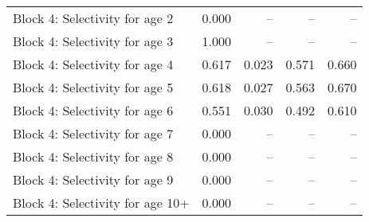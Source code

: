 \documentclass[
]{article}
\begin{document}
\begin{landscape}
\begin{longtable}[t]{lrrrr}
Block 4: Selectivity for age 2 & 0.000 & -- & -- & --\\
Block 4: Selectivity for age 3 & 1.000 & -- & -- & --\\
Block 4: Selectivity for age 4 & 0.617 & 0.023 & 0.571 & 0.660\\
Block 4: Selectivity for age 5 & 0.618 & 0.027 & 0.563 & 0.670\\
\addlinespace
Block 4: Selectivity for age 6 & 0.551 & 0.030 & 0.492 & 0.610\\
Block 4: Selectivity for age 7 & 0.000 & -- & -- & --\\
Block 4: Selectivity for age 8 & 0.000 & -- & -- & --\\
Block 4: Selectivity for age 9 & 0.000 & -- & -- & --\\
Block 4: Selectivity for age 10+ & 0.000 & -- & -- & --\\*
\end{longtable}
\end{landscape}
\end{document}

